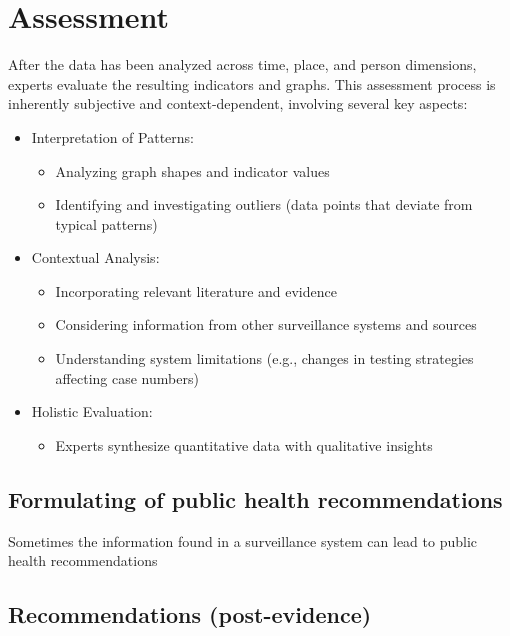 \documentclass[
  letterpaper,
  DIV=11,
  numbers=noendperiod]{scrreprt}
\providecommand{\tightlist}{%
  \setlength{\itemsep}{0pt}\setlength{\parskip}{0pt}}\usepackage{longtable,booktabs,array}
\begin{document}
\section{Assessment}\label{assessment}

After the data has been analyzed across time, place, and person
dimensions, experts evaluate the resulting indicators and graphs. This
assessment process is inherently subjective and context-dependent,
involving several key aspects:

\begin{itemize}
\tightlist
\item
  Interpretation of Patterns:

  \begin{itemize}
  \tightlist
  \item
    Analyzing graph shapes and indicator values
  \item
    Identifying and investigating outliers (data points that deviate
    from typical patterns)
  \end{itemize}
\item
  Contextual Analysis:

  \begin{itemize}
  \tightlist
  \item
    Incorporating relevant literature and evidence
  \item
    Considering information from other surveillance systems and sources
  \item
    Understanding system limitations (e.g., changes in testing
    strategies affecting case numbers)
  \end{itemize}
\item
  Holistic Evaluation:

  \begin{itemize}
  \tightlist
  \item
    Experts synthesize quantitative data with qualitative insights
  \end{itemize}
\end{itemize}

\subsection{Formulating of public health
recommendations}\label{formulating-of-public-health-recommendations}

Sometimes the information found in a surveillance system can lead to
public health recommendations

\subsection{Recommendations (post-evidence)}
\end{document}
